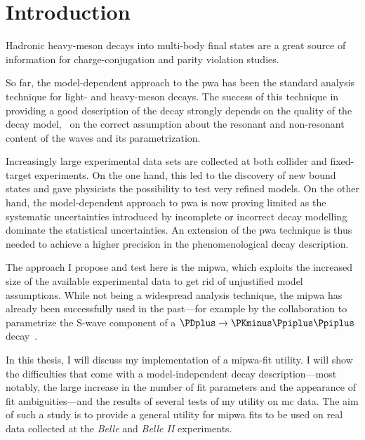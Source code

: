 \chapter{Introduction}
\label{chap:introduction}

    Hadronic heavy-meson decays into multi-body final states are a great source of information for charge-conjugation and parity violation studies.

    So far, the model-dependent approach to the \ac{pwa} has been the standard analysis technique for light- and heavy-meson decays.
    The success of this technique in providing a good description of the decay strongly depends on the quality of the decay model, \ie~on the correct assumption about the resonant and non-resonant content of the waves and its parametrization.


    Increasingly large experimental data sets are collected at both collider and fixed-target experiments.
    On the one hand, this led to the discovery of new bound states and gave physicists the possibility to test very refined models.
    On the other hand, the model-dependent approach to \ac{pwa} is now proving limited as the systematic uncertainties introduced by incomplete or incorrect decay modelling dominate the statistical uncertainties.
    An extension of the \ac{pwa} technique is thus needed to achieve a higher precision in the phenomenological decay description.


    The approach I propose and test here is the \ac{mipwa}, which exploits the increased size of the available experimental data to get rid of unjustified model assumptions.
    While not being a widespread analysis technique, the \ac{mipwa} has already been successfully used in the past---for example by the \focus{} collaboration to parametrize the S-wave component of a $\PDplus\to\PKminus\Ppiplus\Ppiplus$ decay~\cite{Link200914}.


    In this thesis, I will discuss my implementation of a \ac{mipwa}-fit utility.
    I will show the difficulties that come with a model-independent decay description---most notably, the large increase in the number of fit parameters and the appearance of fit ambiguities---and the results of several tests of my utility on \ac{mc} data.
    The aim of such a study is to provide a general utility for \ac{mipwa} fits to be used on real data collected at the \textsl{Belle} and \textsl{Belle II} experiments.


